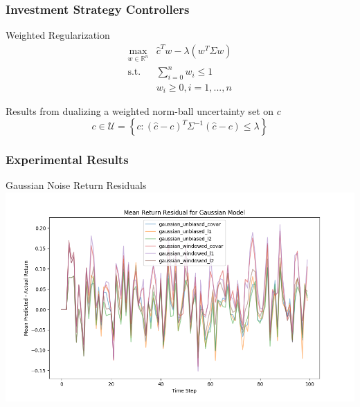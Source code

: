 \documentclass{beamer}
\begin{document}
\begin{frame}
\frametitle{Investment Strategy Controllers}

    \begin{block}{Weighted Regularization}
    \begin{align*}
        \max_{w\in\mathbb{R}^n}{} & \hat{c}^T w - \lambda (w^T \Sigma w) \\
        \mbox{s.t.} & \sum_{i=0}^{n} w_i \leq 1 \\
        & w_i \geq 0, i=1,...,n
    \end{align*}
    \end{block}


    \begin{center}
        Results from dualizing a weighted norm-ball uncertainty set on $c$ \\
        \[ c \in \mathcal{U}=\left\{ c : (\hat{c} - c)^T \Sigma^{-1}(\hat{c} - c) \leq \lambda \right\} \]
    \end{center}

\end{frame}

\begin{frame}
\frametitle{Experimental Results}

\begin{block}{Gaussian Noise Return Residuals}
    \includegraphics[width=\linewidth]{mean_return_residual-Gaussian_model.png}
\end{block}

\end{frame}
\end{document}
